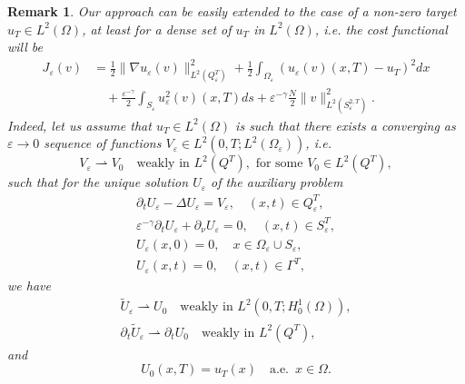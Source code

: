 \documentclass[10pt,a4paper]{amsart}
\numberwithin{equation}{section}
\newtheorem{remark}[theorem]{Remark}
\begin{document}
\begin{remark}
\label{Rem target nonzero} \rm
Our approach can be easily extended to the case of
a non-zero target $u_{T}\in L^2(\Omega )$, at least for a dense set of $%
u_{T}$ in $L^2(\Omega )$, i.e. the cost functional will be%
\begin{equation}
\begin{aligned}
J_{\varepsilon }(v) 
&= \frac{1}{2}\| \nabla {u_{\varepsilon }(v)}\|
_{L^2(Q_{\varepsilon }^{T})}^2+\frac{1}{2}\int _{\Omega
_{\varepsilon }}\left( u_{\varepsilon }(v)(x,T)-u_{T}\right) ^2dx
\\
&\quad +\frac{{\varepsilon }^{-\gamma }}{2}\int _{S_{\varepsilon
}}u_{\varepsilon }^2(v)(x,T){ds}+\varepsilon ^{-\gamma }\frac{N}{2}\| {v%
}\| _{L^2(S_{\varepsilon }^{2,T})}^2.
\end{aligned}  \label{nonzero cost}
\end{equation}
Indeed, let us assume that $u_{T}\in L^2(\Omega )$ is such that there
exists a converging as $\varepsilon \to0$ sequence of functions $%
V_{\varepsilon }\in L^2(0,T;L^2(\Omega _{\varepsilon }))$, i.e.
\begin{equation}
V_{\varepsilon }\rightharpoonup V_0\quad \text{weakly in }L^2(Q^{T}),
\text{ for some }V_0\in L^2(Q^{T}),  \label{hypo Weak  conver Ve}
\end{equation}
such that for the unique solution $U_{\varepsilon }$ of the auxiliary
problem
\begin{equation}
\begin{gathered}
\partial _{t}U_{\varepsilon }-\Delta U_{\varepsilon }=V_{\varepsilon }, \quad
(x,t)\in Q_{\varepsilon }^{T}, \\
\varepsilon ^{-\gamma }\partial _{t}U_{\varepsilon }+\partial _{\nu
}U_{\varepsilon }=0, \quad (x,t)\in S_{\varepsilon }^{T}, \\
U_{\varepsilon }(x,0)=0, \quad x\in \Omega _{\varepsilon }\cup S_{\varepsilon
}, \\
U_{\varepsilon }(x,t)=0, \quad (x,t)\in \Gamma ^{T},%
\end{gathered}
\end{equation}
we have
\begin{gather*}
\widetilde{U}_{\varepsilon }\rightharpoonup U_0\quad \text{weakly in }
L^2(0,T;H_0^{1}(\Omega )), \\
\partial _{t}\widetilde{U}_{\varepsilon }\rightharpoonup \partial _{t}U_0
\quad \text{weakly in }L^2(Q^{T}),
\end{gather*}
and
\[
U_0(x,T)=u_{T}(x)\quad \text{a.e. }\, x\in \Omega .
\]
\end{remark}
\end{document}
